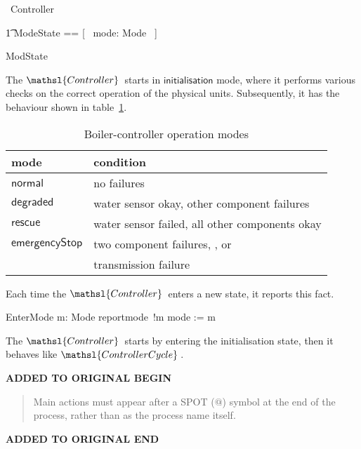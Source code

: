 \documentclass{report}
\newcommand{\true}{\ensuremath{\mathbf{true}}}
\newcommand{\event}[1]{\mathsl{#1}}
\renewcommand{\freetype}[1]{\mathsf{#1}}
\newcommand{\freetypedegraded}{\freetype{degraded}}
\newcommand{\freetypeemergencyStop }{\freetype{emergencyStop}}
\newcommand{\freetypeinitialisation}{\freetype{initialisation}}
\newcommand{\freetypenormal}{\freetype{normal}}
\newcommand{\freetyperescue}{\freetype{rescue}}
\newenvironment{addedstuff}{\begin{flushleft}\textbf{ADDED TO ORIGINAL BEGIN}\begin{quote}\begin{minipage}{.8\textwidth}}{\end{minipage}\end{quote}\textbf{ADDED TO ORIGINAL END}\end{flushleft}}
\begin{document}
\begin{circus}
   \circprocess\ Controller \circdef \circbegin
\end{circus}
\vspace{-5.3ex}
\begin{zed}
  \t1 ModeState == [~ mode: Mode ~]
\end{zed}
\begin{circusaction}
   \circstate ModState
\end{circusaction}
The \( \mathsl{Controller} \, \)\/ starts in \(
\freetypeinitialisation \)\/ mode, where it performs various checks on
the correct operation of the physical units.  Subsequently, it has the
behaviour shown in table~\ref{tab:controller-modes}.


\begin{table}[htbp]
  \begin{center}
    \bigskip %
    \begin{tabular}{l|l}
      \bfseries{mode} & \bfseries{condition}
      \\ %
      \hline %
      \( \freetypenormal \) & no failures
      \\ %
      \( \freetypedegraded \) & water sensor okay, other component failures
      \\ %
      \( \freetyperescue \) & water sensor failed, all other components okay
      \\ %
      \( \freetypeemergencyStop \) & two component failures,
      \event{emergencystop.\true}, or
      \\ %
      & transmission failure
    \end{tabular}
    \caption{Boiler-controller operation modes}
    \label{tab:controller-modes}
  \end{center}
\end{table}

Each time the \( \mathsl{Controller} \, \)\/ enters a new state, it
reports this fact.
\begin{circusaction}
    EnterMode \circdef m: Mode \circspot reportmode~!m \then mode := m \\
\end{circusaction}
The \( \mathsl{Controller} \, \)\/ starts by entering the
initialisation state, then it behaves like \( \mathsl{ControllerCycle}
\, \).

\begin{addedstuff}
   Main actions must appear after a SPOT ($@$) symbol at the end of the process,
   rather than as the process name itself.
\end{addedstuff}
\end{document}
